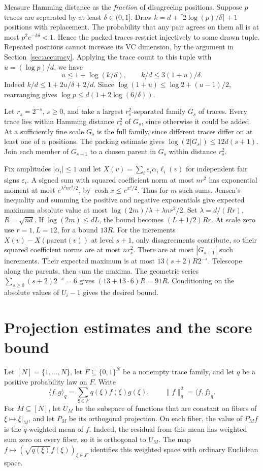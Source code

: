 \documentclass[11pt]{article}
\theoremstyle{definition}\newtheorem{definition}[theorem]{Definition}
\begin{document}
Measure Hamming distance as the \emph{fraction} of disagreeing positions.
Suppose $p$ traces are separated by at least $\delta\in(0,1]$.
Draw $k=d+\lceil2\log(p)/\delta\rceil+1$ positions with replacement.
The probability that any pair agrees on them all is at most
$p^2e^{-k\delta}<1$. Hence the packed traces restrict injectively to some drawn tuple.
Repeated positions cannot increase its VC dimension, by the argument in
Section~\ref{sec:accuracy}. Applying the trace count to this tuple with $u=(\log p)/d$, we have
\[
 u\le1+\log(k/d),\qquad k/d\le3(1+u)/\delta.
\]
Indeed $k/d\le1+2u/\delta+2/d$. Since
$\log(1+u)\le\log2+(u-1)/2$, rearranging gives
$\log p\le d(1+2\log(6/\delta))$.

Let $r_s=2^{-s}$, $s\ge0$, and take a largest $r_s^2$-separated family
$G_s$ of traces. Every trace lies within Hamming distance $r_s^2$ of
$G_s$, since otherwise it could be added. At a sufficiently fine scale
$G_s$ is the full family, since different traces differ on at least one
of $n$ positions. The packing estimate gives
$\log(2|G_s|)\le12d(s+1)$. Join each member of $G_{s+1}$ to a chosen
parent in $G_s$ within distance $r_s^2$.

Fix amplitudes $|\alpha_i|\le1$ and let $X(v)=\sum_i\varepsilon_i\alpha_i\ell_i(v)$
for independent fair signs $\varepsilon_i$. A signed sum with squared
coefficient norm at most $nr^2$ has exponential moment at most
$e^{\lambda^2nr^2/2}$, by $\cosh x\le e^{x^2/2}$. Thus for $m$ such
sums, Jensen's inequality and summing the positive and negative exponentials
give expected maximum absolute value at most
$\log(2m)/\lambda+\lambda nr^2/2$. Set $\lambda=d/(Rr)$, $R=\sqrt{nd}$.
If $\log(2m)\le dL$, the bound becomes $(L+1/2)Rr$.
At scale zero use $r=1,L=12$, for a bound $13R$.
For the increments $X(v)-X(\mathrm{parent}(v))$ at level $s+1$,
only disagreements contribute, so their squared coefficient norms are
at most $nr_s^2$. There are at most $|G_{s+1}|$ such increments.
Their expected maximum is at most $13(s+2)R2^{-s}$.
Telescope along the parents, then sum the maxima. The geometric series
$\sum_{s\ge0}(s+2)2^{-s}=6$ gives $(13+13\cdot6)R=91R$.
Conditioning on the absolute values of $U_i-1$ gives the desired bound.

\section{Projection estimates and the score bound}
\label{app:projection-bounds}

Let $[N]=\{1,\ldots,N\}$, let $F\subseteq\{0,1\}^{N}$ be a nonempty trace family,
and let $q$ be a positive probability law on $F$. Write
\[
  \langle f,g\rangle_q=\sum_{\xi\in F}q(\xi)f(\xi)g(\xi),
  \qquad \|f\|_q^2=\langle f,f\rangle_q.
\]
For $M\subseteq[N]$, let $U_M$ be the subspace of functions that are constant on
fibers of $\xi\mapsto\xi|_M$, and let $P_M$ be its orthogonal projection.
On each fiber, the value of $P_M f$ is the $q$-weighted mean of $f$. Indeed, the
residual from this mean has weighted sum zero on every fiber, so it is orthogonal
to $U_M$. The map $f\mapsto(\sqrt{q(\xi)}f(\xi))_{\xi\in F}$ identifies this
weighted space with ordinary Euclidean space.
\end{document}
